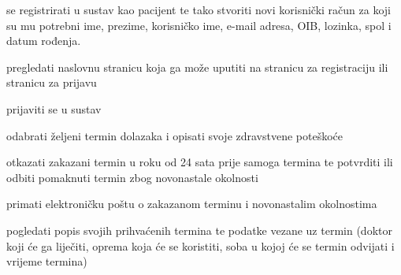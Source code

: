 \begin{packed_enum}
	\item  {}
	
	\begin{packed_enum}
		
		\item se registrirati u sustav kao pacijent te tako stvoriti novi korisnički račun za koji su mu potrebni ime, prezime, korisničko ime, e-mail adresa, OIB, lozinka, spol i datum rođenja.
		\item pregledati naslovnu stranicu koja ga može uputiti na stranicu za registraciju ili stranicu za prijavu
		
		
	\end{packed_enum}
	
	\item  {}
	
	\begin{packed_enum}
		
		\item prijaviti se u sustav
		\item odabrati željeni termin dolazaka i opisati svoje zdravstvene poteškoće
		\item otkazati zakazani termin u roku od 24 sata prije samoga termina te potvrditi ili odbiti pomaknuti termin zbog novonastale okolnosti
		\item primati elektroničku poštu o zakazanom terminu i novonastalim okolnostima
		\item pogledati popis svojih prihvaćenih termina te podatke vezane uz termin (doktor koji će ga liječiti, oprema koja će se koristiti, soba u kojoj će se termin odvijati i vrijeme termina)
		
	\end{packed_enum}
	
	
	\item  {}
	
	\begin{packed_enum}
		

\end{packed_enum}
\end{packed_enum}
